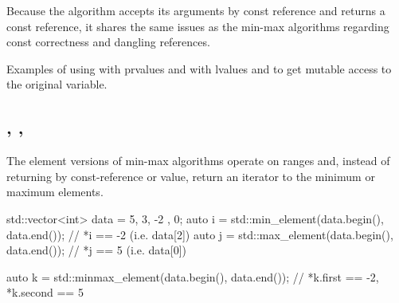 Because the algorithm accepts its arguments by const reference and returns a const reference, it shares the same issues as the min-max algorithms regarding const correctness and dangling references.

\begin{box-note}
\footnotesize Examples of using  with prvalues and with lvalues and  to get mutable access to the original variable.
\tcblower
{}
\end{box-note}


\subsection{\texorpdfstring{, , }{\texttt{std::min\_element}, \texttt{std::max\_element}, \texttt{std::minmax\_element}}}

The element versions of min-max algorithms operate on ranges and, instead of returning by const-reference or value, return an iterator to the minimum or maximum elements.



\begin{box-note}
\begin{cppcode}
std::vector<int> data = { 5, 3, -2 , 0};
auto i = std::min_element(data.begin(), data.end());
// *i == -2 (i.e. data[2])
auto j = std::max_element(data.begin(), data.end());
// *j == 5 (i.e. data[0])

auto k = std::minmax_element(data.begin(), data.end());
// *k.first == -2, *k.second == 5
\end{cppcode}
\end{box-note}

